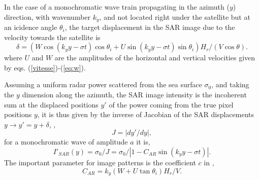 In the case of a monochromatic wave train propagating in the azimuth ($y$) direction, with wavenumber $k_y$, and not located right under the satellite but at an icidence angle $\theta_i$, 
the target displacement in the SAR image due to the velocity towards the satellite is 
\begin{equation}
 \delta = \left ( W \cos (k_y  y - \sigma t) \cos \theta_i  + U \sin (k_y  y - \sigma t) \sin  \theta_i  \right) H_r/(V \cos \theta). \label{eq:delA}
\end{equation}
where $U$ and $W$ are the amplitudes of the horizontal and vertical velocities given by eqs. (\ref{vitesse})-(\ref{eq:w}). 

Assuming a uniform radar power scattered from the sea surface $\sigma_0$, and taking the $y$ dimension  along the azimuth, 
the SAR image intensity is the incoherent sum at the displaced positions $y'$ of the power coming from the true pixel positions $y$, it is thus given by the inverse of Jacobian of the SAR displacements 
$y \rightarrow y'=y+\delta$, \citep[see eq. 21  in][]{Hasselmann&Hasselmann1991}, 
\begin{equation}
 J = \left|dy'/dy\right|,
\end{equation}
for a monochromatic wave of amplitude $a$ it is, 
\begin{equation}
I'_{SAR}(y) = \sigma_0/J = \sigma_0 / \left|1 -  C_{AR}  \sin( k_y y- \sigma t) \right|\label{ISAR}.
\end{equation}
The important parameter for image patterns is the coefficient $c$ in \cite{Alpers&Rufenach1979}, 
\begin{equation}
  C_{AR}=k_y (W + U \tan \theta_i) H_r/V.\label{eq:CAR_def}
\end{equation}


